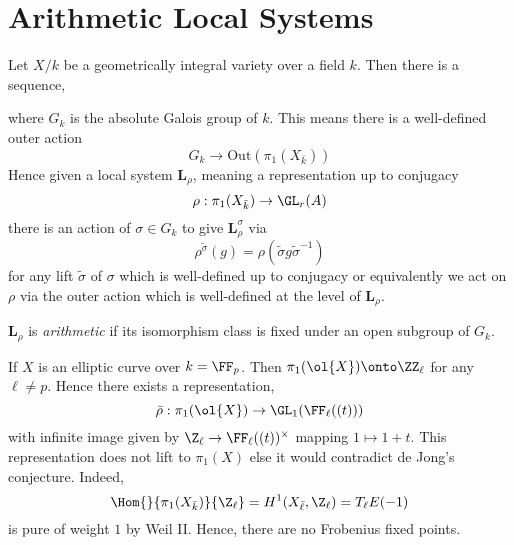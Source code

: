 \documentclass{article}
\newcommand{\LL}{\mathbf{L}}
\begin{document}
\section{Arithmetic Local Systems}

Let $X/k$ be a geometrically integral variety over a field $k$. Then there is a sequence,
\begin{center}
\end{center}
where $G_k$ is the absolute Galois group of $k$. This means there is a well-defined outer action
\[ G_k \to \mathrm{Out}(\pi_1(X_{\bar{k}})) \]
Hence given a local system $\LL_{\rho}$, meaning a representation up to conjugacy
\[ \rho : \pi_1(X_{\bar{k}}) \to \GL_r(A) \]
there is an action of $\sigma \in G_k$ to give $\LL_{\rho}^\sigma$ via 
\[ \rho^{\tilde{\sigma}}(g) = \rho(\tilde{\sigma} g \tilde{\sigma}^{-1}) \]
for any lift $\tilde{\sigma}$ of $\sigma$ which is well-defined up to conjugacy or equivalently we act on $\rho$ via the outer action which is well-defined at the level of $\LL_{\rho}$. 

\begin{defn}
$\LL_{\rho}$ is \textit{arithmetic} if its isomorphism class is fixed under an open subgroup of $G_k$.
\end{defn}

\begin{example}
If $X$ is an elliptic curve over $k = \FF_p$. Then $\pi_1(\ol{X}) \onto \ZZ_\ell$ for any $\ell \neq p$. Hence there exists a representation,
\[ \bar{\rho} : \pi_1(\ol{X}) \to \GL_1(\FF_{\ell}((t))) \]
with infinite image given by $\Z_\ell \to \FF_{\ell}((t))^\times$ mapping $1 \mapsto 1 + t$. This representation does not lift to $\pi_1(X)$ else it would contradict de Jong's conjecture. Indeed, 
\[ \Hom{}{\pi_1(X_{\bar{k}})}{\Z_\ell} = H^1(X_{\bar{\ell}}, \Z_\ell) = T_{\ell} E(-1) \]
is pure of weight $1$ by Weil II. Hence, there are no Frobenius fixed points.  
\end{example}
\end{document}

